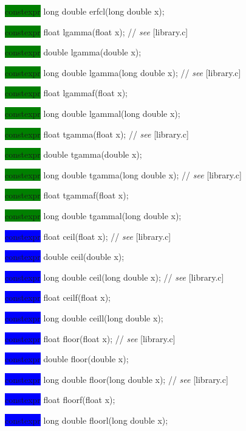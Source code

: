 \documentclass[prd,twocolumn,amsmath,amssymb,nofootinbib,eqsecnum]{revtex4-1}
\newcommand{\highlight}[1]{\colorbox{green}{\!\!\!\! #1}}
\newcommand{\oldhighlight}[1]{\colorbox{blue}{\!\!\!\! #1}}
\newcommand{\stdcomment}[1]{{// {\it see} [#1]}}
\begin{document}
{\highlight{constexpr} long double erfcl(long double x);

\vspace{2ex}


\highlight{constexpr} float lgamma(float x); \stdcomment{library.c}

\highlight{constexpr} double lgamma(double x);

\highlight{constexpr} long double lgamma(long double x); \stdcomment{library.c}

\highlight{constexpr} float lgammaf(float x);

\highlight{constexpr} long double lgammal(long double x);

\vspace{2ex}

\highlight{constexpr} float tgamma(float x); \stdcomment{library.c}

\highlight{constexpr} double tgamma(double x);

\highlight{constexpr} long double tgamma(long double x); \stdcomment{library.c}

\highlight{constexpr} float tgammaf(float x);

\highlight{constexpr} long double tgammal(long double x);

\vspace{2ex}

\oldhighlight{constexpr} float ceil(float x); \stdcomment{library.c}

\oldhighlight{constexpr} double ceil(double x);

\oldhighlight{constexpr} long double ceil(long double x); \stdcomment{library.c}

\oldhighlight{constexpr} float ceilf(float x);

\oldhighlight{constexpr} long double ceill(long double x);

\vspace{2ex}


\oldhighlight{constexpr} float floor(float x); \stdcomment{library.c}

\oldhighlight{constexpr} double floor(double x);

\oldhighlight{constexpr} long double floor(long double x); \stdcomment{library.c}

\oldhighlight{constexpr} float floorf(float x);

\oldhighlight{constexpr} long double floorl(long double x);

}
\end{document}
